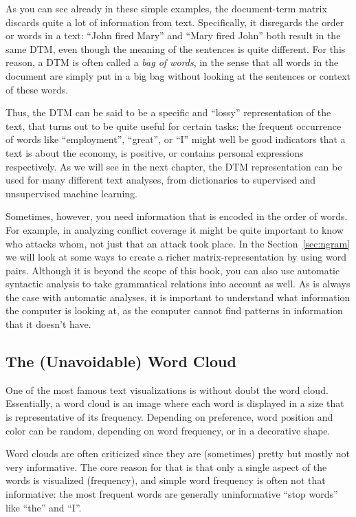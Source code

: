 As you can see already in these simple examples, the document-term matrix discards quite a lot of information from text.
Specifically, it disregards the order or words in a text: ``John fired Mary'' and ``Mary fired John'' both result in the same DTM,
even though the meaning of the sentences is quite different.
For this reason, a DTM is often called a \emph{bag of words}, in the sense that all words in the document are simply put in a big bag
without looking at the sentences or context of these words.

Thus, the DTM can be said to be a specific and ``lossy'' representation of the text, that turns out to be quite useful for certain tasks:
the frequent occurrence of words like ``employment'', ``great'', or ``I'' might well be good indicators that a text is about the economy,
is positive, or contains personal expressions respectively.
As we will see in the next chapter, the DTM representation can be used for many different text analyses, from dictionaries to supervised and unsupervised machine learning.

Sometimes, however, you need information that is encoded in the order of words.
For example, in analyzing conflict coverage it might be quite important to know who attacks whom, not just that an attack took place.
In the Section~\ref{sec:ngram} we will look at some ways to create a richer matrix-representation by using word pairs.
Although it is beyond the scope of this book,
you can also use automatic syntactic analysis to take grammatical relations into account as well.
As is always the case with automatic analyses, it is important to understand what information the computer is looking at,
as the computer cannot find patterns in information that it doesn't have.

\subsection{The (Unavoidable) Word Cloud}\label{sec:wordcloud}

 One of the most famous text visualizations is without doubt the word cloud.
Essentially, a word cloud is an image where each word is displayed in a size that is representative of its frequency.
Depending on preference, word position and color can be random, depending on word frequency, or in a decorative shape.

Word clouds are often criticized since they are (sometimes) pretty but mostly not very informative.
The core reason for that is that only a single aspect of the words is visualized (frequency),
and simple word frequency is often not that informative: the most frequent words are generally uninformative ``stop words'' like ``the'' and ``I''.

